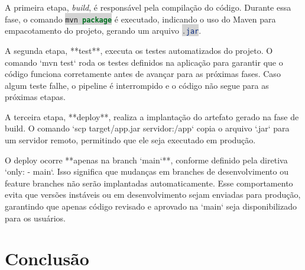 \documentclass[a4paper,12pt]{article}
\newcommand{\inlinecode}[2]{\colorbox{lightgray}{\lstinline[language=#1]$#2$}}
\begin{document}
A primeira etapa, \textit{build}, é responsável pela compilação do código. Durante essa fase, o comando \inlinecode{java}{mvn package} é executado, indicando o uso do Maven para empacotamento do projeto, gerando um arquivo \inlinecode{java}{.jar}.  

A segunda etapa, **test**, executa os testes automatizados do projeto. O comando `mvn test` roda os testes definidos na aplicação para garantir que o código funciona corretamente antes de avançar para as próximas fases. Caso algum teste falhe, o pipeline é interrompido e o código não segue para as próximas etapas.  

A terceira etapa, **deploy**, realiza a implantação do artefato gerado na fase de build. O comando `scp target/app.jar servidor:/app` copia o arquivo `.jar` para um servidor remoto, permitindo que ele seja executado em produção.  

O deploy ocorre **apenas na branch `main`**, conforme definido pela diretiva `only: - main`. Isso significa que mudanças em branches de desenvolvimento ou feature branches não serão implantadas automaticamente. Esse comportamento evita que versões instáveis ou em desenvolvimento sejam enviadas para produção, garantindo que apenas código revisado e aprovado na `main` seja disponibilizado para os usuários.  


\newpage{}

\section*{Conclusão}
\lipsum[4] %
\end{document}
